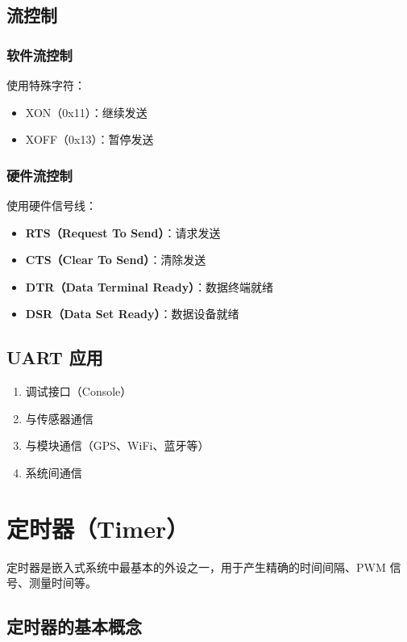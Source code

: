 \subsection{流控制}

\subsubsection{软件流控制}

使用特殊字符：
\begin{itemize}
  \item XON（0x11）：继续发送
  \item XOFF（0x13）：暂停发送
\end{itemize}

\subsubsection{硬件流控制}

使用硬件信号线：
\begin{itemize}
  \item \textbf{RTS（Request To Send）}：请求发送
  \item \textbf{CTS（Clear To Send）}：清除发送
  \item \textbf{DTR（Data Terminal Ready）}：数据终端就绪
  \item \textbf{DSR（Data Set Ready）}：数据设备就绪
\end{itemize}

\subsection{UART 应用}

\begin{enumerate}
  \item 调试接口（Console）
  \item 与传感器通信
  \item 与模块通信（GPS、WiFi、蓝牙等）
  \item 系统间通信
\end{enumerate}

\section{定时器（Timer）}

定时器是嵌入式系统中最基本的外设之一，用于产生精确的时间间隔、PWM 信号、测量时间等。

\subsection{定时器的基本概念}

